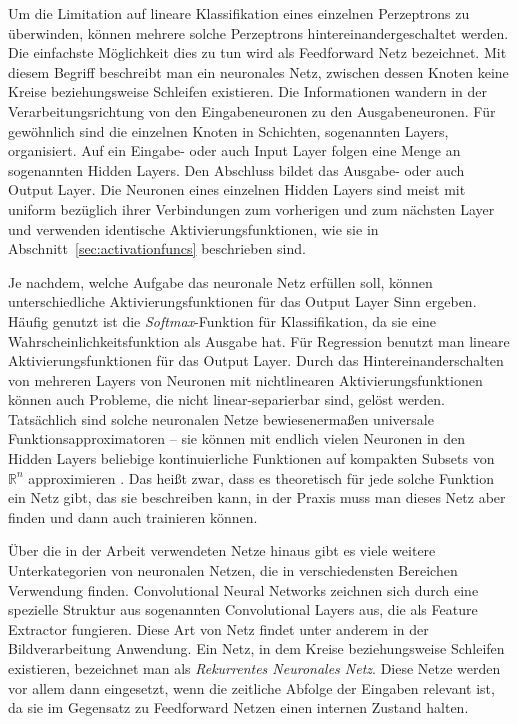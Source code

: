 Um die Limitation auf lineare Klassifikation eines einzelnen Perzeptrons zu überwinden, können mehrere solche Perzeptrons hintereinandergeschaltet werden. 
Die einfachste Möglichkeit dies zu tun wird als Feedforward Netz bezeichnet.
Mit diesem Begriff beschreibt man ein neuronales Netz, zwischen dessen Knoten keine Kreise beziehungsweise Schleifen existieren.
Die Informationen wandern in der Verarbeitungsrichtung von den Eingabeneuronen zu den Ausgabeneuronen.
Für gewöhnlich sind die einzelnen Knoten in Schichten, sogenannten Layers, organisiert.
Auf ein Eingabe- oder auch Input Layer folgen eine Menge an sogenannten Hidden Layers.
Den Abschluss bildet das Ausgabe- oder auch Output Layer.
Die Neuronen eines einzelnen Hidden Layers sind meist mit uniform bezüglich ihrer Verbindungen zum vorherigen und zum nächsten Layer und verwenden identische Aktivierungsfunktionen, wie sie in Abschnitt~\ref{sec:activationfuncs} beschrieben sind.

Je nachdem, welche Aufgabe das neuronale Netz erfüllen soll, können unterschiedliche Aktivierungsfunktionen für das Output Layer Sinn ergeben.
Häufig genutzt ist die \textit{Softmax}-Funktion für Klassifikation, da sie eine Wahrscheinlichkeitsfunktion als Ausgabe hat.
Für Regression benutzt man lineare Aktivierungsfunktionen für das Output Layer. 
Durch das Hintereinanderschalten von mehreren Layers von Neuronen mit nichtlinearen Aktivierungsfunktionen können auch Probleme, die nicht linear-separierbar sind, gelöst werden.
Tatsächlich sind solche neuronalen Netze bewiesenermaßen universale Funktionsapproximatoren -- 
sie können mit endlich vielen Neuronen in den Hidden Layers beliebige kontinuierliche Funktionen auf kompakten Subsets von \(\mathbb{R}^n\) approximieren \cite[Unterabschnitt 6.4.1]{Goodfellow-et-al-2016}.
Das heißt zwar, dass es theoretisch für jede solche Funktion ein Netz gibt, das sie beschreiben kann, in der Praxis muss man dieses Netz aber finden und dann auch trainieren können.

Über die in der Arbeit verwendeten Netze hinaus gibt es viele weitere Unterkategorien von neuronalen Netzen, die in verschiedensten Bereichen Verwendung finden.
Convolutional Neural Networks zeichnen sich durch eine spezielle Struktur aus sogenannten Convolutional Layers aus, die als Feature Extractor fungieren.
Diese Art von Netz findet unter anderem in der Bildverarbeitung Anwendung.
Ein Netz, in dem Kreise beziehungsweise Schleifen existieren, bezeichnet man als \textit{Rekurrentes Neuronales Netz}.
Diese Netze werden vor allem dann eingesetzt, wenn die zeitliche Abfolge der Eingaben relevant ist, 
da sie im Gegensatz zu Feedforward Netzen einen internen Zustand halten.

